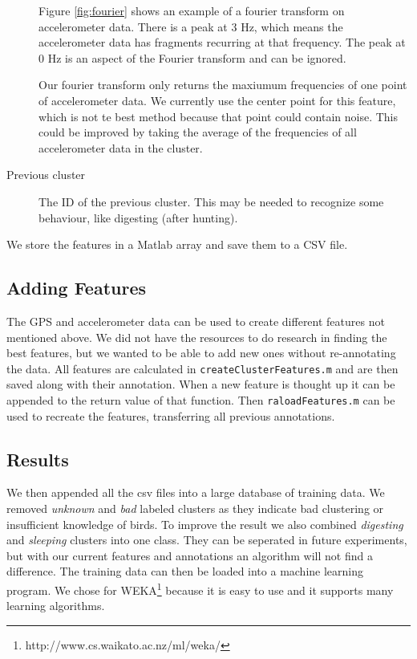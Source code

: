 \begin{description}
  Figure \ref{fig:fourier} shows an example of a fourier transform on accelerometer data. There is a peak at 3 Hz, which means the accelerometer data has fragments recurring at that frequency. The peak at 0 Hz is an aspect of the Fourier transform and can be ignored. 

  Our fourier transform only returns the maxiumum frequencies of one point of accelerometer data. We currently use the center point for this feature, which is not te best method because that point could contain noise. This could be improved by taking the average of the frequencies of all accelerometer data in the cluster.
  \item[Previous cluster] The ID of the previous cluster. This may be needed to recognize some behaviour, like digesting (after hunting).
 \end{description}

 We store the features in a Matlab array and save them to a CSV file.

\subsection{Adding Features}
The GPS and accelerometer data can be used to create different features not mentioned above. We did not have the resources to do research in finding the best features, but we wanted to be able to add new ones without re-annotating the data. All features are calculated in \verb|createClusterFeatures.m| and are then saved along with their annotation. When a new feature is thought up it can be appended to the return value of that function. Then \verb|raloadFeatures.m| can be used to recreate the features, transferring all previous annotations. 

 \subsection{Results}
 We then appended all the csv files into a large database of training data. We removed \emph{unknown} and \emph{bad} labeled clusters as they indicate bad clustering or insufficient knowledge of birds. To improve the result we also combined \emph{digesting} and \emph{sleeping} clusters into one class. They can be seperated in future experiments, but with our current features and annotations an algorithm will not find a difference. The training data can then be loaded into a machine learning program. We chose for WEKA\footnote{http://www.cs.waikato.ac.nz/ml/weka/} because it is easy to use and it supports many learning algorithms.


